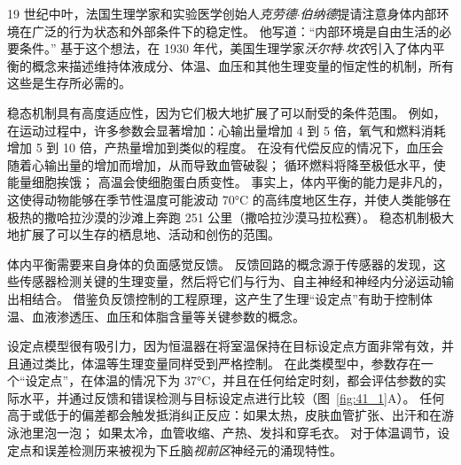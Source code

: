 19 世纪中叶，法国生理学家和实验医学创始人\textit{克劳德$\cdot$伯纳德}提请注意身体内部环境在广泛的行为状态和外部条件下的稳定性。
他写道：“内部环境是自由生活的必要条件。” 
基于这个想法，在 1930 年代，美国生理学家\textit{沃尔特$\cdot$坎农}引入了体内平衡的概念来描述维持体液成分、体温、血压和其他生理变量的恒定性的机制，所有这些是生存所必需的。


稳态机制具有高度适应性，因为它们极大地扩展了可以耐受的条件范围。
例如，在运动过程中，许多参数会显著增加：心输出量增加 4 到 5 倍，氧气和燃料消耗增加 5 到 10 倍，产热量增加到类似的程度。
在没有代偿反应的情况下，血压会随着心输出量的增加而增加，从而导致血管破裂；
循环燃料将降至极低水平，使能量细胞挨饿；
高温会使细胞蛋白质变性。
事实上，体内平衡的能力是非凡的，这使得动物能够在季节性温度可能波动 70°C 的高纬度地区生存，并使人类能够在极热的撒哈拉沙漠的沙滩上奔跑 251 公里（撒哈拉沙漠马拉松赛）。
稳态机制极大地扩展了可以生存的栖息地、活动和创伤的范围。


体内平衡需要来自身体的负面感觉反馈。
反馈回路的概念源于传感器的发现，这些传感器检测关键的生理变量，然后将它们与行为、自主神经和神经内分泌运动输出相结合。
借鉴负反馈控制的工程原理，这产生了生理“设定点”有助于控制体温、血液渗透压、血压和体脂含量等关键参数的概念。


设定点模型很有吸引力，因为恒温器在将室温保持在目标设定点方面非常有效，并且通过类比，体温等生理变量同样受到严格控制。
在此类模型中，参数存在一个“设定点”，在体温的情况下为 37°C，并且在任何给定时刻，都会评估参数的实际水平，并通过反馈和错误检测与目标设定点进行比较（图~\ref{fig:41_1}A）。
任何高于或低于的偏差都会触发抵消纠正反应：如果太热，皮肤血管扩张、出汗和在游泳池里泡一泡；
如果太冷，血管收缩、产热、发抖和穿毛衣。
对于体温调节，设定点和误差检测历来被视为下丘脑\textit{视前区}神经元的涌现特性。


